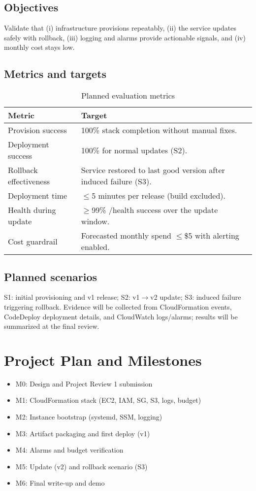 \documentclass[12pt]{article}
\begin{document}
\subsection{Objectives}
Validate that (i) infrastructure provisions repeatably, (ii) the service updates safely with rollback, (iii) logging and alarms provide actionable signals, and (iv) monthly cost stays low.

\subsection{Metrics and targets}
\begin{table}[h]
\centering
\caption{Planned evaluation metrics}
\begin{tabular}{p{}p{}}
\hline
Metric & Target \\
\hline
Provision success & 100\% stack completion without manual fixes. \\
Deployment success & 100\% for normal updates (S2). \\
Rollback effectiveness & Service restored to last good version after induced failure (S3). \\
Deployment time & $\leq$5 minutes per release (build excluded). \\
Health during update & $\geq$99\% /health success over the update window. \\
Cost guardrail & Forecasted monthly spend $\leq$\$5 with alerting enabled. \\
\hline
\end{tabular}
\end{table}

\subsection{Planned scenarios}
S1: initial provisioning and v1 release; S2: v1$\rightarrow$v2 update; S3: induced failure triggering rollback. Evidence will be collected from CloudFormation events, CodeDeploy deployment details, and CloudWatch logs/alarms; results will be summarized at the final review.

\section{Project Plan and Milestones}\label{sec:plan}

\begin{itemize}
\item M0: Design and Project Review 1 submission
\item M1: CloudFormation stack (EC2, IAM, SG, S3, logs, budget)
\item M2: Instance bootstrap (systemd, SSM, logging)
\item M3: Artifact packaging and first deploy (v1)
\item M4: Alarms and budget verification
\item M5: Update (v2) and rollback scenario (S3)
\item M6: Final write-up and demo
\end{itemize}
\end{document}
